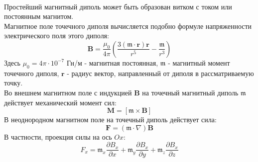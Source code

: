 \documentclass[a4paper, 12pt]{article}
\begin{document}
\paragraph{}
Простейший магнитный диполь может быть образован витком с током или постоянным магнитом.\\
Магнитное поле точечного диполя вычисляется подобно формуле напряженности электрического поля этого диполя:
\begin{equation}
    \mathbf{B} = \frac{\mu_{0}}{4 \pi}\left(\frac{3({\mathfrak{m}} \cdot \mathbf{r}) \mathbf{r}}{r^{5}} - \frac{{\mathfrak{m}}}{r^{3}}\right)
    \label{Магнитное поле диполя}
\end{equation}
Здесь $\mu_{0} = 4\pi \cdot 10^{-7}$ Гн/м - магнитная постоянная, $\mathbf{\mathfrak{m}}$ - магнитный момент точечного диполя, $\mathbf{r}$ - радиус вектор, направленный от диполя в рассматриваемую точку.\\
Во внешнем магнитном поле с индукцией $\mathbf{B}$ на точечный магнитный диполь $\mathfrak{m}$ действует механический момент сил:
\begin{equation}
    \mathbf{M} = [\mathfrak{m} \times \mathbf{B}]
    \label{Момент}
\end{equation}
В неоднородном магнитном поле на точечный диполь действует сила:
\begin{equation}
    \mathbf{F} = (\mathfrak{m} \cdot \nabla)\mathbf{B}
    \label{Сила действия на диполь}
\end{equation}
В частности, проекция силы на ось $\mathit{Ox}$:
\begin{equation}
    F_{x} = \mathfrak{m}_{x}\frac{\partial B_{x}}{\partial x} + \mathfrak{m}_{y}\frac{\partial B_{x}}{\partial y} + \mathfrak{m}_{z}\frac{\partial B_{x}}{\partial z}
    \label{Проекция силы}
\end{equation}
\end{document}
